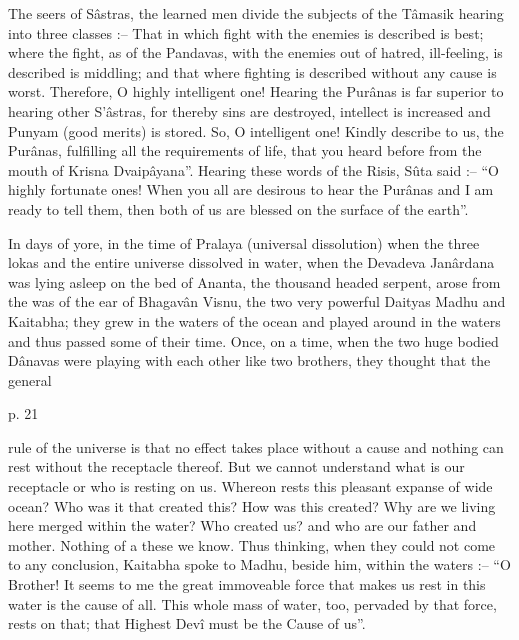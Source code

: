  

The seers of Sâstras, the learned men divide the subjects of the Tâmasik hearing into three classes :-- That in which fight with the enemies is described is best; where the fight, as of the Pandavas, with the enemies out of hatred, ill-feeling, is described is middling; and that where fighting is described without any cause is worst. Therefore, O highly intelligent one! Hearing the Purânas is far superior to hearing other S’âstras, for thereby sins are destroyed, intellect is increased and Punyam (good merits) is stored. So, O intelligent one! Kindly describe to us, the Purânas, fulfilling all the requirements of life, that you heard before from the mouth of Krisna Dvaipâyana”. Hearing these words of the Risis, Sûta said :-- “O highly fortunate ones! When you all are desirous to hear the Purânas and I am ready to tell them, then both of us are blessed on the surface of the earth”.

 

In days of yore, in the time of Pralaya (universal dissolution) when the three lokas and the entire universe dissolved in water, when the Devadeva Janârdana was lying asleep on the bed of Ananta, the thousand headed serpent, arose from the was of the ear of Bhagavân Visnu, the two very powerful Daityas Madhu and Kaitabha; they grew in the waters of the ocean and played around in the waters and thus passed some of their time. Once, on a time, when the two huge bodied Dânavas were playing with each other like two brothers, they thought that the general

 

p. 21

 

rule of the universe is that no effect takes place without a cause and nothing can rest without the receptacle thereof. But we cannot understand what is our receptacle or who is resting on us. Whereon rests this pleasant expanse of wide ocean? Who was it that created this? How was this created? Why are we living here merged within the water? Who created us? and who are our father and mother. Nothing of a these we know. Thus thinking, when they could not come to any conclusion, Kaitabha spoke to Madhu, beside him, within the waters :-- “O Brother! It seems to me the great immoveable force that makes us rest in this water is the cause of all. This whole mass of water, too, pervaded by that force, rests on that; that Highest Devî must be the Cause of us”.

 

